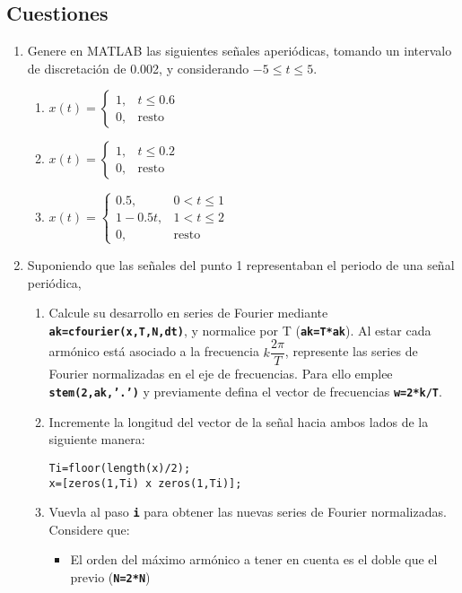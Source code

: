 \documentclass{article}
\newcommand{\code}[1]{\texttt{\textbf{#1}}}
\begin{document}
\subsection*{Cuestiones}
\begin{enumerate}[leftmargin=*]
	\item Genere en MATLAB las siguientes señales aperiódicas, tomando un intervalo de discretación de 0.002, y considerando $-5\le t\le5$.
	\begin{enumerate}[label=\alph*)]
		\item $x(t)=\begin{cases}
			1, & t\le0.6\\
			0,&\text{resto}
		\end{cases}$
		\item $x(t)=\begin{cases}
			1, & t\le0.2\\
			0, & \mathrm{resto}
		\end{cases}$
		\item $x(t)=\begin{cases}
			0.5, & 0<t\le1\\
			1-0.5t,&1<t\le2\\
			0,& \mathrm{resto}
		\end{cases}$
	\end{enumerate}
	\item Suponiendo que las señales del punto 1 representaban el periodo de una señal periódica,
	\begin{enumerate}[label=\roman*)]
		\item Calcule su desarrollo en series de Fourier mediante \code{ak=cfourier(x,T,N,dt)}, y normalice por T (\code{ak=T*ak}). Al estar cada armónico está asociado a la frecuencia $k\dfrac{2\pi}{T}$, represente las series de Fourier normalizadas en el eje de frecuencias. Para ello emplee \code{stem(2,ak,'.')} y previamente defina el vector de frecuencias \code{w=2*\textpi*k/T}.
		\item Incremente la longitud del vector de la señal hacia ambos lados de la siguiente manera:
		\begin{lstlisting}
Ti=floor(length(x)/2);
x=[zeros(1,Ti) x zeros(1,Ti)];
		\end{lstlisting}
		\item Vuevla al paso \code{i} para obtener las nuevas series de Fourier normalizadas. Considere que:
		\begin{itemize}[label=$-$]
			\item El orden del máximo armónico a tener en cuenta es el doble que el previo (\code{N=2*N})

\end{itemize}
\end{enumerate}
\end{enumerate}
\end{document}
